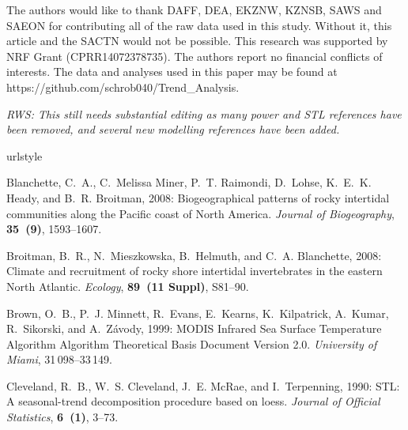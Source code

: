 \documentclass{ametsoc}
\begin{document}
\acknowledgments
The authors would like to thank DAFF, DEA, EKZNW, KZNSB, SAWS and SAEON for contributing all of the raw data used in this study. Without it, this article and the SACTN would not be possible. This research was supported by NRF Grant (CPRR14072378735). The authors report no financial conflicts of interests. The data and analyses used in this paper may be found at https://github.com/schrob040/Trend_Analysis.

%
\emph{RWS: This still needs substantial editing as many power and STL references have been removed, and several new modelling references have been added.}
\begin{thebibliography}{23}
\providecommand{\natexlab}[1]{#1}
\providecommand{\url}[1]{\texttt{#1}}
\renewcommand{\UrlFont}{\rmfamily}
\providecommand{\urlprefix}{URL }
\expandafter\ifx\csname urlstyle\endcsname\relax
  \providecommand{\doi}[1]{doi:\discretionary{}{}{}#1}\else
  \providecommand{\doi}{doi:\discretionary{}{}{}\begingroup
  \urlstyle{rm}\Url}\fi
\providecommand{\eprint}[2][]{\url{#2}}

Blanchette, C.~A., C.~{Melissa Miner}, P.~T. Raimondi, D.~Lohse, K.~E.~K.
  Heady, and B.~R. Broitman, 2008: {Biogeographical patterns of rocky
  intertidal communities along the Pacific coast of North America}.
  \textit{Journal of Biogeography}, \textbf{35~(9)}, 1593--1607.

Broitman, B.~R., N.~Mieszkowska, B.~Helmuth, and C.~A. Blanchette, 2008:
  {Climate and recruitment of rocky shore intertidal invertebrates in the
  eastern North Atlantic.} \textit{Ecology}, \textbf{89~(11 Suppl)}, S81--90.

Brown, O.~B., P.~J. Minnett, R.~Evans, E.~Kearns, K.~Kilpatrick, A.~Kumar,
  R.~Sikorski, and A.~Z{\'{a}}vody, 1999: {MODIS Infrared Sea Surface
  Temperature Algorithm Algorithm Theoretical Basis Document Version 2.0}.
  \textit{University of Miami}, 31\,098--33\,149.

Cleveland, R.~B., W.~S. Cleveland, J.~E. McRae, and I.~Terpenning, 1990: {STL:
  A seasonal-trend decomposition procedure based on loess}. \textit{Journal of
  Official Statistics}, \textbf{6~(1)}, 3--73.


\end{thebibliography}
\end{document}
